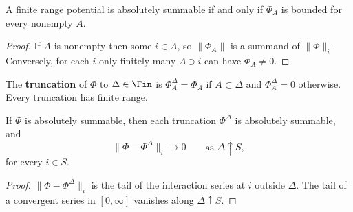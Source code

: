 \begin{lemma}
    \label{lem:pot-finite-range-abs-summable}
    \leanok{}

    A finite range potential is absolutely summable if and only if $\Phi_A$ is bounded for
    every nonempty $A$.
\end{lemma}
\begin{proof}
    \leanok{}

    If $A$ is nonempty then some $i\in A$, so $\|\Phi_A\|$ is a summand of $\|\Phi\|_i$.
    Conversely, for each $i$ only finitely many $A\ni i$ can have $\Phi_A\neq 0$.
\end{proof}

\begin{definition}[Truncation]
    \label{def:pot-truncation}
    \leanok{}

    The \textbf{truncation} of $\Phi$ to $\Delta\in\Fin$ is
    $\Phi^\Delta_A=\Phi_A$ if $A\subset\Delta$ and $\Phi^\Delta_A=0$ otherwise. Every
    truncation has finite range.
\end{definition}

\begin{theorem}
    \label{thm:pot-truncation-dense}
    \leanok{}

    If $\Phi$ is absolutely summable, then each truncation $\Phi^\Delta$ is absolutely
    summable, and
    \[
      \|\Phi-\Phi^\Delta\|_i\to 0\qquad\text{as }\Delta\uparrow S,
    \]
    for every $i\in S$.
\end{theorem}
\begin{proof}
    \leanok{}

    $\|\Phi-\Phi^\Delta\|_i$ is the tail of the interaction series at $i$ outside $\Delta$.
    The tail of a convergent series in $[0,\infty]$ vanishes along $\Delta\uparrow S$.
\end{proof}

